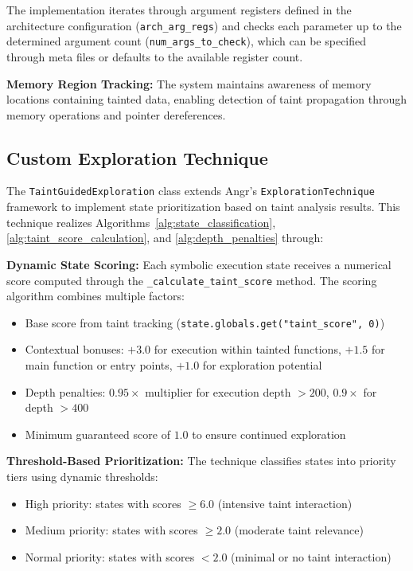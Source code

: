 The implementation iterates through argument registers defined in the architecture configuration (\texttt{arch\_arg\_regs}) and checks each parameter up to the determined argument count (\texttt{num\_args\_to\_check}), which can be specified through meta files or defaults to the available register count.

\textbf{Memory Region Tracking:} The system maintains awareness of memory locations containing tainted data, enabling detection of taint propagation through memory operations and pointer dereferences.

\subsection{Custom Exploration Technique}

The \texttt{TaintGuidedExploration} class extends Angr's \texttt{ExplorationTechnique} framework to implement state prioritization based on taint analysis results. This technique realizes Algorithms~\ref{alg:state_classification}, \ref{alg:taint_score_calculation}, and \ref{alg:depth_penalties} through:

\textbf{Dynamic State Scoring:} Each symbolic execution state receives a numerical score computed through the \texttt{\_calculate\_taint\_score} method. The scoring algorithm combines multiple factors:
\begin{itemize}
    \item Base score from taint tracking (\texttt{state.globals.get("taint\_score", 0)})
    \item Contextual bonuses: $+3.0$ for execution within tainted functions, $+1.5$ for main function or entry points, $+1.0$ for exploration potential
    \item Depth penalties: $0.95 \times$ multiplier for execution depth $>200$, $0.9 \times$ for depth $>400$
    \item Minimum guaranteed score of $1.0$ to ensure continued exploration
\end{itemize}

\textbf{Threshold-Based Prioritization:} The technique classifies states into priority tiers using dynamic thresholds:
\begin{itemize}
    \item High priority: states with scores $\geq 6.0$ (intensive taint interaction)
    \item Medium priority: states with scores $\geq 2.0$ (moderate taint relevance)
    \item Normal priority: states with scores $< 2.0$ (minimal or no taint interaction)
\end{itemize}

